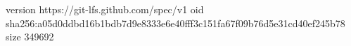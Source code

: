 version https://git-lfs.github.com/spec/v1
oid sha256:a05d0ddbd16b1bdb7d9e8333e6e40fff3c151fa67f09b76d5e31cd40ef245b78
size 349692
